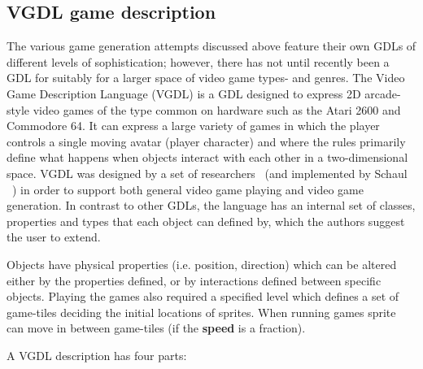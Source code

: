 \documentclass[a4paper,titlepage,final, twoside]{report}
\begin{document}
\subsection{VGDL game description}
\label{ssec_vgdl}
The various game generation attempts discussed above feature their own GDLs of different levels of sophistication; however, there has not until recently been a GDL for suitably for a larger space of video game types- and genres.
The Video Game Description Language (VGDL) is a GDL designed to express 2D arcade-style video games of the type common on hardware such as the Atari 2600 and Commodore 64. It can express a large variety of games in which the player controls a single moving avatar (player character) and where the rules primarily define what happens when objects interact with each other in a two-dimensional space. VGDL was designed by a set of researchers~\citet{levine2013general,ebner2013towards} (and implemented by Schaul ~\citet{schaul2013video}) in order to support both general video game playing and video game generation.
In contrast to other GDLs, the language has an internal set of classes, properties and types that each object can defined by, which the authors suggest the user to extend.

Objects have physical properties (i.e. position, direction) which can be altered either by the properties defined, or by interactions defined between specific objects. 
Playing the games also required a specified level which defines a set of game-tiles deciding the initial locations of sprites. When running games sprite can move in between game-tiles (if the \textbf{speed} is a fraction).

A VGDL description has four parts: 
\end{document}
